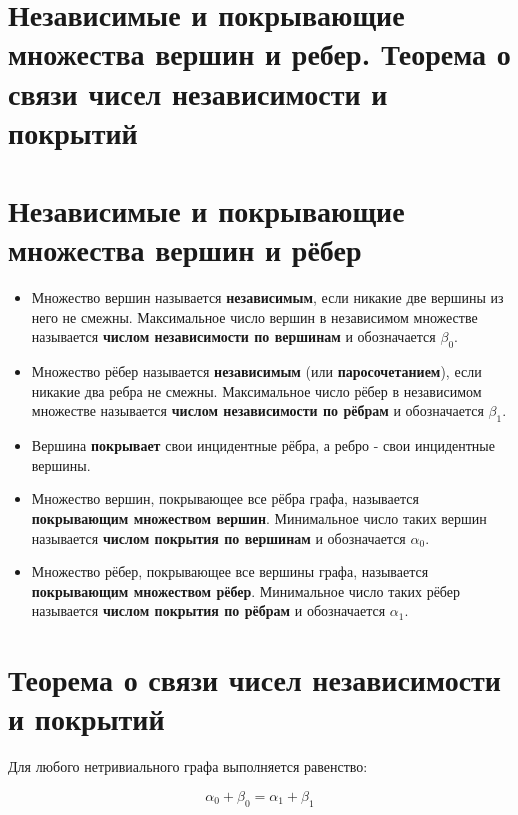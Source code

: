 {
	\section{Независимые и покрывающие множества вершин и ребер. Теорема о связи чисел
независимости и покрытий}

\section*{Независимые и покрывающие множества вершин и рёбер}

\begin{itemize}
  \item Множество вершин называется \textbf{независимым}, если никакие две вершины из него не смежны.  
  Максимальное число вершин в независимом множестве называется \textbf{числом независимости по вершинам} и обозначается $\beta_0$.

  \item Множество рёбер называется \textbf{независимым} (или \textbf{паросочетанием}), если никакие два ребра не смежны.  
  Максимальное число рёбер в независимом множестве называется \textbf{числом независимости по рёбрам} и обозначается $\beta_1$.

  \item Вершина \textbf{покрывает} свои инцидентные рёбра, а ребро - свои инцидентные вершины.

  \item Множество вершин, покрывающее все рёбра графа, называется \textbf{покрывающим множеством вершин}.  
  Минимальное число таких вершин называется \textbf{числом покрытия по вершинам} и обозначается $\alpha_0$.

  \item Множество рёбер, покрывающее все вершины графа, называется \textbf{покрывающим множеством рёбер}.  
  Минимальное число таких рёбер называется \textbf{числом покрытия по рёбрам} и обозначается $\alpha_1$.
\end{itemize}

\section*{Теорема о связи чисел независимости и покрытий}

Для любого нетривиального графа выполняется равенство:


\[
\alpha_0 + \beta_0 = \alpha_1 + \beta_1
\]




    \newpage
}
